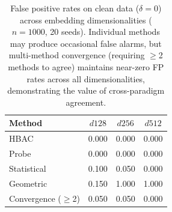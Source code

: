 \begin{table}[ht]
\centering
\scriptsize
\caption{False positive rates on clean data ($\delta{=}0$) across embedding dimensionalities ($n{=}1000$, 20 seeds). Individual methods may produce occasional false alarms, but multi-method convergence (requiring $\geq$2 methods to agree) maintains near-zero FP rates across all dimensionalities, demonstrating the value of cross-paradigm agreement.}
\label{tab:fp_rates}
\begin{tabular}{lccc}
\hline
\textbf{Method} & $d{128}$ & $d{256}$ & $d{512}$ \\
\hline
HBAC & 0.000 & 0.000 & 0.000 \\
Probe & 0.000 & 0.000 & 0.000 \\
Statistical & 0.100 & 0.050 & 0.000 \\
Geometric & 0.150 & 1.000 & 1.000 \\
\hline
Convergence ($\geq$2) & 0.050 & 0.050 & 0.000 \\
\hline
\end{tabular}
\end{table}